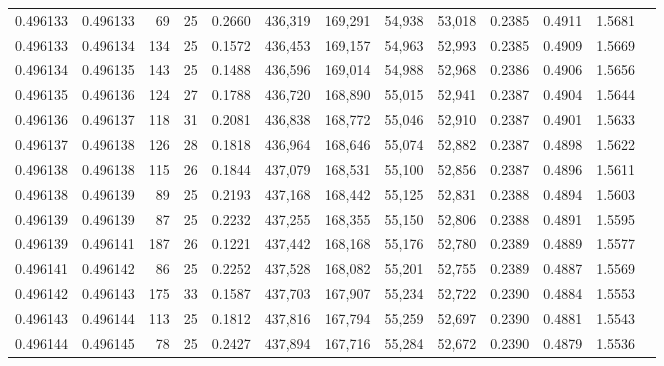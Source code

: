 \begin{tabular}{rrrrrrrrrrrrr}
0.496133 & 0.496133 &  69 &  25 &                                     0.2660 & 436,319 & 169,291 &  54,938 &  53,018 & 0.2385 & 0.4911 & 1.5681 \\
0.496133 & 0.496134 & 134 &  25 &                                     0.1572 & 436,453 & 169,157 &  54,963 &  52,993 & 0.2385 & 0.4909 & 1.5669 \\
0.496134 & 0.496135 & 143 &  25 &                                     0.1488 & 436,596 & 169,014 &  54,988 &  52,968 & 0.2386 & 0.4906 & 1.5656 \\
0.496135 & 0.496136 & 124 &  27 &                                     0.1788 & 436,720 & 168,890 &  55,015 &  52,941 & 0.2387 & 0.4904 & 1.5644 \\
0.496136 & 0.496137 & 118 &  31 &                                     0.2081 & 436,838 & 168,772 &  55,046 &  52,910 & 0.2387 & 0.4901 & 1.5633 \\
0.496137 & 0.496138 & 126 &  28 &                                     0.1818 & 436,964 & 168,646 &  55,074 &  52,882 & 0.2387 & 0.4898 & 1.5622 \\
0.496138 & 0.496138 & 115 &  26 &                                     0.1844 & 437,079 & 168,531 &  55,100 &  52,856 & 0.2387 & 0.4896 & 1.5611 \\
0.496138 & 0.496139 &  89 &  25 &                                     0.2193 & 437,168 & 168,442 &  55,125 &  52,831 & 0.2388 & 0.4894 & 1.5603 \\
0.496139 & 0.496139 &  87 &  25 &                                     0.2232 & 437,255 & 168,355 &  55,150 &  52,806 & 0.2388 & 0.4891 & 1.5595 \\
0.496139 & 0.496141 & 187 &  26 &                                     0.1221 & 437,442 & 168,168 &  55,176 &  52,780 & 0.2389 & 0.4889 & 1.5577 \\
0.496141 & 0.496142 &  86 &  25 &                                     0.2252 & 437,528 & 168,082 &  55,201 &  52,755 & 0.2389 & 0.4887 & 1.5569 \\
0.496142 & 0.496143 & 175 &  33 &                                     0.1587 & 437,703 & 167,907 &  55,234 &  52,722 & 0.2390 & 0.4884 & 1.5553 \\
0.496143 & 0.496144 & 113 &  25 &                                     0.1812 & 437,816 & 167,794 &  55,259 &  52,697 & 0.2390 & 0.4881 & 1.5543 \\
0.496144 & 0.496145 &  78 &  25 &                                     0.2427 & 437,894 & 167,716 &  55,284 &  52,672 & 0.2390 & 0.4879 & 1.5536 \\

\end{tabular}
